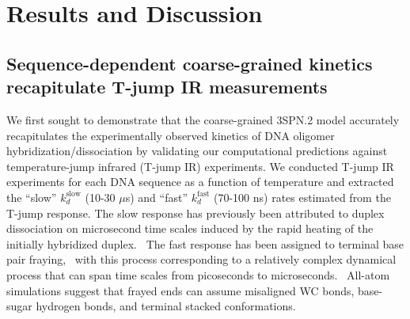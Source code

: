 \documentclass[journal=jpcbfk,manuscript=article]{achemso}
\begin{document}
\section{\label{sec:Results}Results and Discussion}

\subsection{Sequence-dependent coarse-grained kinetics recapitulate T-jump IR measurements} \label{sec:time}

We first sought to demonstrate that the coarse-grained 3SPN.2 model accurately recapitulates the experimentally observed kinetics of DNA oligomer hybridization/dissociation by validating our computational predictions against temperature-jump infrared (T-jump IR) experiments. We conducted T-jump IR experiments for each DNA sequence as a function of temperature and extracted the ``slow'' $k_d^\mathrm{slow}$ (10-30 $\mu$s) and ``fast'' $k_d^\mathrm{fast}$ (70-100 ns) rates estimated from the T-jump response. The slow response has previously been attributed to duplex dissociation on microsecond time scales induced by the rapid heating of the initially hybridized duplex.~\citep{Sanstead2016, Sanstead2018DirectDehybridization} The fast response has been assigned to terminal base pair fraying,~\citep{Sanstead2016, Sanstead2018DirectDehybridization} with this process corresponding to a relatively complex dynamical process that can span time scales from picoseconds to microseconds.~\cite{Nonin1995TerminalFraying, Nikolova2012ProbingSimulations, Andreatta2006UltrafastHelix, Galindo-Murillo2015ConvergenceDGCACGAACGAACGAACGC} All-atom simulations suggest that frayed ends can assume misaligned WC bonds, base-sugar hydrogen bonds, and terminal stacked conformations.~\citep{Pinamonti2019TheModels, Zgarbova2014BaseRNA} 
\end{document}
